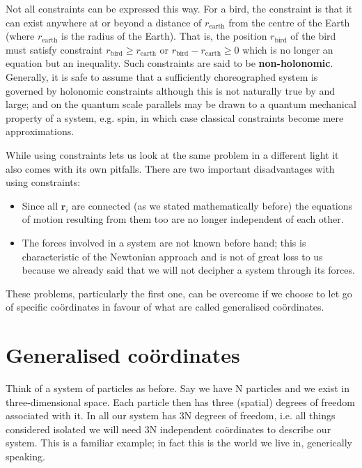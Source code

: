 \documentclass[english,seminar,headertitle]{lecture}
\begin{document}
Not all constraints can be expressed this way. For a bird, the constraint is that it can exist anywhere at or beyond a distance of $r_\textrm{earth}$ from the centre of the Earth (where $r_\textrm{earth}$ is the radius of the Earth). That is, the position $r_\textrm{bird}$ of the bird must satisfy constraint $r_\textrm{bird} \ge r_\textrm{earth}$ or $r_\textrm{bird} - r_\textrm{earth} \ge 0$ which is no longer an equation but an inequality. Such constraints are said to be \textbf{non-holonomic}. Generally, it is safe to assume that a sufficiently choreographed system is governed by holonomic constraints although this is not naturally true by and large; and on the quantum scale parallels may be drawn to a quantum mechanical property of a system, e.g. spin, in which case classical constraints become mere approximations.

While using constraints lets us look at the same problem in a different light it also comes with its own pitfalls. There are two important disadvantages with using constraints:

\begin{itemize}
	\item Since all $\mathbf{r}_i$ are connected (as we stated mathematically before) the equations of motion resulting from them too are no longer independent of each other.
	\item The forces involved in a system are not known before hand; this is characteristic of the Newtonian approach and is not of great loss to us because we already said that we will not decipher a system through its forces.
\end{itemize}

These problems, particularly the first one, can be overcome if we choose to let go of specific co\"{o}rdinates in favour of what are called generalised co\"{o}rdinates.
%
\section{Generalised co\"{o}rdinates}\label{sec:generalised-coordinates}
%
Think of a system of particles as before. Say we have N particles and we exist in three-dimensional space. Each particle then has three (spatial) degrees of freedom associated with it. In all our system has 3N degrees of freedom, i.e. all things considered isolated we will need 3N independent co\"{o}rdinates to describe our system. This is a familiar example; in fact this is the world we live in, generically speaking.
\end{document}
